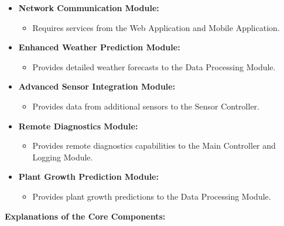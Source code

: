 \begin{itemize}
    \item \textbf{Network Communication Module:}
    \begin{itemize}
        \item Requires services from the Web Application and Mobile Application.
    \end{itemize}
    
    \item \textbf{Enhanced Weather Prediction Module:}
    \begin{itemize}
        \item Provides detailed weather forecasts to the Data Processing Module.
    \end{itemize}

    \item \textbf{Advanced Sensor Integration Module:}
    \begin{itemize}
        \item Provides data from additional sensors to the Sensor Controller.
    \end{itemize}

    \item \textbf{Remote Diagnostics Module:}
    \begin{itemize}
        \item Provides remote diagnostics capabilities to the Main Controller and Logging Module.
    \end{itemize}
    
    \item \textbf{Plant Growth Prediction Module:}
    \begin{itemize}
        \item Provides plant growth predictions to the Data Processing Module.
    \end{itemize}
\end{itemize}

\textbf{Explanations of the Core Components:}

